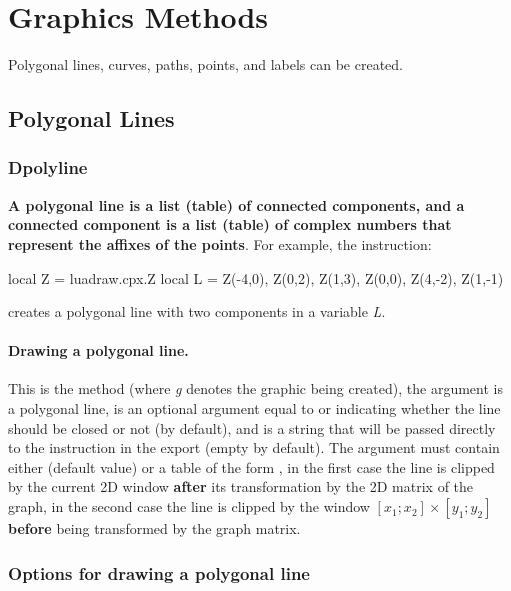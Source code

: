 \section{Graphics Methods}

Polygonal lines, curves, paths, points, and labels can be created.

\subsection{Polygonal Lines}

\subsubsection{Dpolyline}

\textbf{A polygonal line is a list (table) of connected components, and a connected component is a list (table) of complex numbers that represent the affixes of the points}. For example, the instruction:
\begin{Luacode}
local Z = luadraw.cpx.Z
local L = { {Z(-4,0), Z(0,2), Z(1,3)}, {Z(0,0), Z(4,-2), Z(1,-1)} }
\end{Luacode}
creates a polygonal line with two components in a variable \emph{L}.

\paragraph{Drawing a polygonal line.}

This is the  method (where \emph{g} denotes the graphic being created), the argument  is a polygonal line,  is an optional argument equal to \true or \false indicating whether the line should be closed or not (\false by default), and  is a string that will be passed directly to the \drawcmd instruction in the export (empty by default). The argument  must contain either \nil (default value) or a table of the form , in the first case the line is clipped by the current 2D window \textbf{after} its transformation by the 2D matrix of the graph, in the second case the line is clipped by the window $[x_1;x_2]\times[y_1;y_2]$ \textbf{before} being transformed by the graph matrix.


\subsubsection{Options for drawing a polygonal line}

